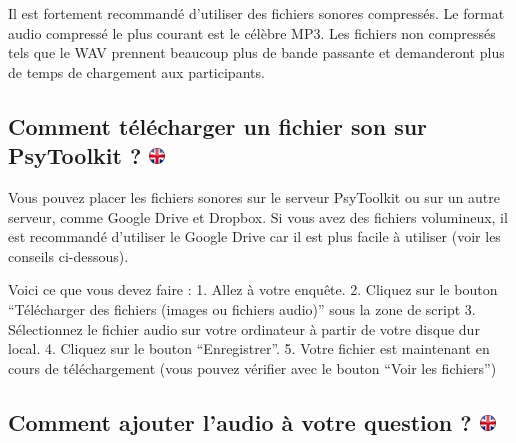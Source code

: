 \documentclass[
]{book}
\begin{document}
Il est fortement recommandé d'utiliser des fichiers sonores compressés. Le format audio compressé le plus courant est le célèbre MP3. Les fichiers non compressés tels que le WAV prennent beaucoup plus de bande passante et demanderont plus de temps de chargement aux participants.

\hypertarget{comment-tuxe9luxe9charger-un-fichier-son-sur-psytoolkit}{%
\subsection[Comment télécharger un fichier son sur PsyToolkit ? ]{\texorpdfstring{Comment télécharger un fichier son sur PsyToolkit ? \href{https://www.psytoolkit.org/lessons/surveyaudiovideo.html\#_how_to_upload_a_sound_file_to_psytoolkit}{\protect\includegraphics{img/ukflag.png}}}{Comment télécharger un fichier son sur PsyToolkit ? }}\label{comment-tuxe9luxe9charger-un-fichier-son-sur-psytoolkit}}

Vous pouvez placer les fichiers sonores sur le serveur PsyToolkit ou sur un autre serveur, comme Google Drive et Dropbox. Si vous avez des fichiers volumineux, il est recommandé d'utiliser le Google Drive car il est plus facile à utiliser (voir les conseils ci-dessous).

Voici ce que vous devez faire :
1. Allez à votre enquête.
2. Cliquez sur le bouton ``Télécharger des fichiers (images ou fichiers audio)'' sous la zone de script
3. Sélectionnez le fichier audio sur votre ordinateur à partir de votre disque dur local.
4. Cliquez sur le bouton ``Enregistrer''.
5. Votre fichier est maintenant en cours de téléchargement (vous pouvez vérifier avec le bouton ``Voir les fichiers'')

\hypertarget{comment-ajouter-laudio-uxe0-votre-question}{%
\subsection[Comment ajouter l'audio à votre question ? ]{\texorpdfstring{Comment ajouter l'audio à votre question ? \href{https://www.psytoolkit.org/lessons/surveyaudiovideo.html\#_how_to_add_the_audio_to_your_question}{\protect\includegraphics{img/ukflag.png}}}{Comment ajouter l'audio à votre question ? }}\label{comment-ajouter-laudio-uxe0-votre-question}}
\end{document}
